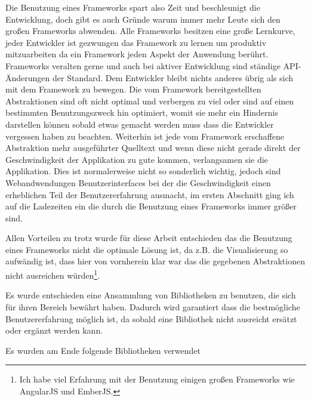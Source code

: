 \documentclass[12pt,twoside]{book}
\begin{document}
Die Benutzung eines Frameworks spart also Zeit und beschleunigt die Entwicklung, doch gibt es auch Gründe warum immer mehr Leute sich den großen Frameworks abwenden.
Alle Frameworks besitzen eine große Lernkurve, jeder Entwickler ist gezwungen das Framework zu lernen um produktiv mitzuarbeiten da ein Framework jeden Aspekt der Anwendung berührt. Frameworks veralten gerne und auch bei aktiver Entwicklung sind ständige API-Änderungen der Standard. Dem Entwickler bleibt nichts anderes übrig als sich mit dem Framework zu bewegen. Die vom Framework bereitgestellten Abstraktionen sind oft nicht optimal und verbergen zu viel oder sind auf einen bestimmten Benutzungszweck hin optimiert, womit sie mehr ein Hindernis darstellen können sobald etwas gemacht werden muss dass die Entwickler vergessen haben zu beachten.
Weiterhin ist jede vom Framework erschaffene Abstraktion mehr ausgeführter Quelltext und wenn diese nicht gerade direkt der Geschwindigkeit der Applikation zu gute kommen, verlangsamen sie die Applikation. Dies ist normalerweise nicht so sonderlich wichtig, jedoch sind Webandwendungen Benutzerinterfaces bei der die Geschwindigkeit einen erheblichen Teil der Benutzererfahrung ausmacht, im ersten Abschnitt ging ich auf die Ladezeiten ein die durch die Benutzung eines Frameworks immer größer sind.

Allen Vorteilen zu trotz wurde für diese Arbeit entschieden das die Benutzung eines Frameworks nicht die optimale Lösung ist, da z.B. die Visualisierung so aufwändig ist, dass hier von vornherein klar war das die gegebenen Abstraktionen nicht ausreichen würden\footnote{Ich habe viel Erfahrung mit der Benutzung einigen großen Frameworks wie AngularJS und EmberJS.}.

Es wurde entschieden eine Ansammlung von Bibliotheken zu benutzen, die sich für ihren Bereich bewährt haben. Dadurch wird garantiert dass die bestmögliche Benutzererfahrung möglich ist, da sobald eine Bibliothek nicht ausreicht ersätzt oder ergänzt werden kann.

Es wurden am Ende folgende Bibliotheken verwendet
\end{document}

